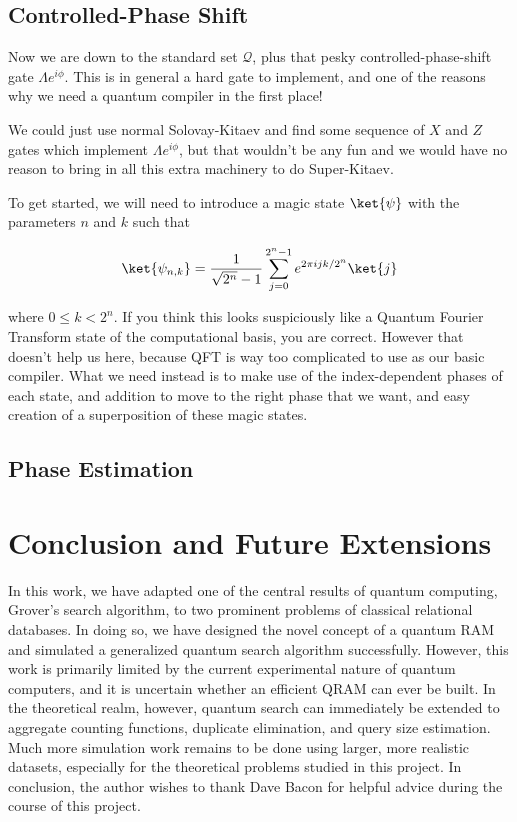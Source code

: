 \documentclass{article}
\theoremstyle{plain}
\begin{document}
\subsection{Controlled-Phase Shift}
\label{subsec:phase-shift}

Now we are down to the standard set $\mathcal{Q}$, plus that pesky
controlled-phase-shift gate $\Lambda{e^{i\phi}}$. This is in general a hard
gate to implement, and one of the reasons why we need a quantum compiler in
the first place!

We could just use normal Solovay-Kitaev and find some sequence of $X$ and
$Z$ gates which implement $\Lambda{e^{i\phi}}$, but that wouldn't be any
fun and we would have no reason to bring in all this extra machinery to
do Super-Kitaev.

To get started, we will need to introduce a magic state $\ket{\psi}$ with the
parameters $n$ and $k$ such that

\begin{equation}
\ket{\psi_{n,k}} = \frac{1}{\sqrt{2^n}-1} \sum_{j=0}^{2^n-1} e^{2\pi i j k / 2^n} \ket{j}
\end{equation}

where $0 \le k \lt 2^n$. If you think this looks suspiciously like a
Quantum Fourier Transform state of the computational basis, you are correct.
However that doesn't help us here, because QFT is way too complicated to use as
our basic compiler. What we need instead is to make use of the index-dependent
phases of each state, and addition to move to the right phase that we want,
and easy creation of a superposition of these magic states.




\subsection{Phase Estimation}
\label{subsec:phase-estimate}

\section{Conclusion and Future Extensions}
\label{sec:conclude}

In this work, we have adapted one of the central results of quantum
computing, Grover's search algorithm, to two prominent problems of
classical relational databases. In doing so, we have designed the novel
concept of a quantum RAM and simulated a generalized quantum search
algorithm successfully.
However, this work is primarily limited by the current experimental
nature of quantum computers, and it is uncertain whether an efficient
QRAM can ever be built. In the theoretical realm, however, quantum search
can immediately be extended to aggregate counting functions, duplicate
elimination, and query size estimation.
Much more simulation work remains to be done using larger,
more realistic datasets, especially for the theoretical
problems studied in this project.
In conclusion, the author wishes to thank Dave Bacon for helpful advice
during the
course of this project.



\end{document}
